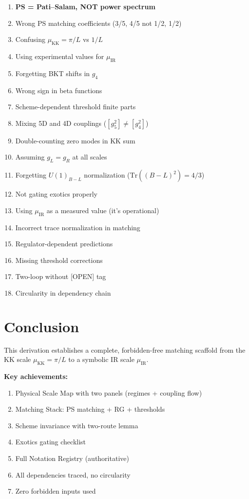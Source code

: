 \documentclass[11pt,a4paper]{article}
\begin{document}
\begin{enumerate}[label=\textbf{Trap \arabic*}:]
\item \textbf{PS = Pati--Salam, NOT power spectrum}
\item Wrong PS matching coefficients (3/5, 4/5 not 1/2, 1/2)
\item Confusing $\mu_{\text{KK}} = \pi/L$ vs $1/L$
\item Using experimental values for $\mu_{\text{IR}}$
\item Forgetting BKT shifts in $g_4$
\item Wrong sign in beta functions
\item Scheme-dependent threshold finite parts
\item Mixing 5D and 4D couplings ($[g_5^2] \neq [g_4^2]$)
\item Double-counting zero modes in KK sum
\item Assuming $g_L = g_R$ at all scales
\item Forgetting $U(1)_{B-L}$ normalization ($\text{Tr}((B-L)^2) = 4/3$)
\item Not gating exotics properly
\item Using $\mu_{\text{IR}}$ as a measured value (it's operational)
\item Incorrect trace normalization in matching
\item Regulator-dependent predictions
\item Missing threshold corrections
\item Two-loop without [OPEN] tag
\item Circularity in dependency chain
\end{enumerate}

\section{Conclusion}
\label{sec:conclusion}

This derivation establishes a complete, forbidden-free matching scaffold from
the KK scale $\mu_{\text{KK}} = \pi/L$ to a symbolic IR scale $\mu_{\text{IR}}$.

\textbf{Key achievements:}
\begin{enumerate}
\item Physical Scale Map with two panels (regimes + coupling flow)
\item Matching Stack: PS matching + RG + thresholds
\item Scheme invariance with two-route lemma
\item Exotics gating checklist
\item Full Notation Registry (authoritative)
\item All dependencies traced, no circularity
\item Zero forbidden inputs used
\end{enumerate}
\end{document}
